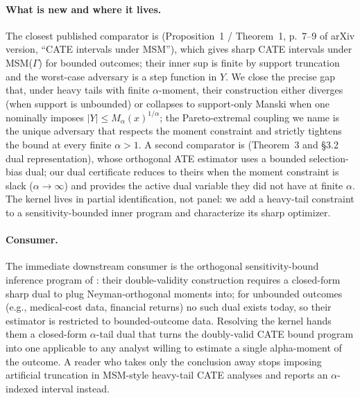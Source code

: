 \documentclass[11pt]{article}
\theoremstyle{definition}
\theoremstyle{plain}
\theoremstyle{remark}
\begin{document}
\paragraph{What is new and where it lives.} The closest published comparator is \cite{KallusMaoZhou2019CATEIntervals} (Proposition~1 / Theorem~1, p.~7--9 of arXiv version, ``CATE intervals under MSM''), which gives sharp CATE intervals under MSM($\Gamma$) for bounded outcomes; their inner sup is finite by support truncation and the worst-case adversary is a step function in $Y$. We close the precise gap that, under heavy tails with finite $\alpha$-moment, their construction either diverges (when support is unbounded) or collapses to support-only Manski when one nominally imposes $|Y|\le M_\alpha(x)^{1/\alpha}$; the Pareto-extremal coupling we name is the unique adversary that respects the moment constraint and strictly tightens the bound at every finite $\alpha>1$. A second comparator is \cite{YadlowskyNamkoongBasuDuchiTian2022Bounds} (Theorem~3 and \S3.2 dual representation), whose orthogonal ATE estimator uses a bounded selection-bias dual; our dual certificate reduces to theirs when the moment constraint is slack ($\alpha\to\infty$) and provides the active dual variable they did not have at finite $\alpha$. The kernel lives in partial identification, not panel: we add a heavy-tail constraint to a sensitivity-bounded inner program and characterize its sharp optimizer.

\paragraph{Consumer.} The immediate downstream consumer is the orthogonal sensitivity-bound inference program of \cite{DornGuoKallus2025DVDS}: their double-validity construction requires a closed-form sharp dual to plug Neyman-orthogonal moments into; for unbounded outcomes (e.g., medical-cost data, financial returns) no such dual exists today, so their estimator is restricted to bounded-outcome data. Resolving the kernel hands them a closed-form $\alpha$-tail dual that turns the doubly-valid CATE bound program into one applicable to any analyst willing to estimate a single alpha-moment of the outcome. A reader who takes only the conclusion away stops imposing artificial truncation in MSM-style heavy-tail CATE analyses and reports an $\alpha$-indexed interval instead.
\end{document}

